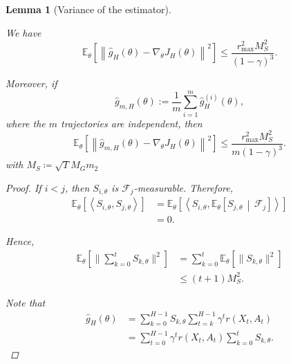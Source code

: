 \documentclass{article}
\newtheorem{lem}[thm]{Lemma}
\theoremstyle{definition}
\theoremstyle{remark}
\theoremstyle{mystyle}
\newcommand{\1}{\mathbbm{1}}
\begin{document}
\begin{lem}[Variance of the estimator] 
\label{lem:truncated-gradient-variance}



We have
\[
\mathbb E_\theta
\left[
\left\|
\widehat g_H(\theta)
-
\nabla_\theta J_H(\theta)
\right\|^2
\right]
\le
\frac{r_{\max}^2M_S^2}{(1-\gamma)^3}.
\tag{V}
\]

Moreover, if
\[
\widehat g_{m,H}(\theta)
:=
\frac{1}{m}
\sum_{i=1}^m
\widehat g_H^{(i)}(\theta),
\]
where the \(m\) trajectories are independent, then
\[
\mathbb E_\theta
\left[
\left\|
\widehat g_{m,H}(\theta)
-
\nabla_\theta J_H(\theta)
\right\|^2
\right]
\le
\frac{r_{\max}^2M_S^2}
{m(1-\gamma)^3}.
\tag{V-m}
\]
with $M_S\coloneqq\sqrt{T}M_Gm_2$

\begin{proof}

If \(i<j\), then \(S_{i,\theta}\) is
\(\mathcal F_j\)-measurable. Therefore,
\[
\begin{aligned}
\mathbb E_\theta
\left[
\left\langle
S_{i,\theta},S_{j,\theta}
\right\rangle
\right]
&=
\mathbb E_\theta
\left[
\left\langle
S_{i,\theta},
\mathbb E_\theta
\left[
S_{j,\theta}
\,\middle|\,
\mathcal F_j
\right]
\right\rangle
\right]
\\
&=0.
\end{aligned}
\]

Hence,
\[
\begin{aligned}
\mathbb E_\theta
\left[
\|\sum_{k=0}^t S_{k,\theta}\|^2
\right]
&=
\sum_{k=0}^t
\mathbb E_\theta
\left[
\|S_{k,\theta}\|^2
\right]
\\
&\le
(t+1)M_S^2.
\end{aligned}
\tag{1}
\]

Note that
\[
\begin{aligned}
\widehat g_H(\theta)
&=
\sum_{k=0}^{H-1}
S_{k,\theta}
\sum_{t=k}^{H-1}
\gamma^t r(X_t,A_t)
\\
&=
\sum_{t=0}^{H-1}
\gamma^t r(X_t,A_t)\sum_{k=0}^t S_{k,\theta}.
\end{aligned}
\tag{2}
\]


\end{proof}
\end{lem}
\end{document}
